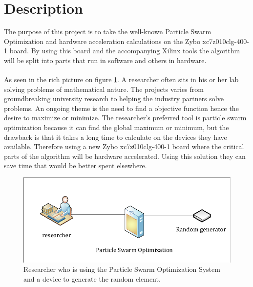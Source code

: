 \section{Description}\label{sc:problemdescription}
The purpose of this project is to take the well-known Particle Swarm Optimization \cite{Blondin2009} and hardware acceleration calculations on the Zybo xc7z010clg-400-1 board. By using this board and the accompanying Xilinx tools the algorithm will be split into parts that run in software and others in hardware. 
\\\\
As seen in the rich picture on figure \ref{fig:descriptiondiagram}. A researcher often sits in his or her lab solving problems of mathematical nature. The projects varies from groundbreaking university research to helping the industry partners solve problems. An ongoing theme is the need to find a objective function hence the desire to maximize or minimize.
The researcher's preferred tool is particle swarm optimization because it can find the global maximum or minimum, but the drawback is that it takes a long time to calculate on the devices they have available. Therefore using a new Zybo xc7z010clg-400-1 board where the critical parts of the algorithm will be hardware accelerated. Using this solution they can save time that would be better spent elsewhere.

\begin{figure}[H]
	\centering
	\includegraphics[width=0.7\linewidth]{diagram/description_diagram}
	\caption{Researcher who is using the Particle Swarm Optimization System and a device to generate the random element.}
	\label{fig:descriptiondiagram}
\end{figure}